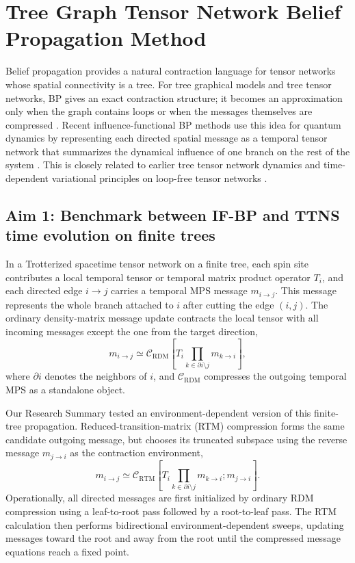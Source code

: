 \documentclass[12pt]{article}
\begin{document}
\section{Tree Graph Tensor Network Belief Propagation Method}

Belief propagation provides a natural contraction language for tensor networks whose spatial connectivity is a tree.
For tree graphical models and tree tensor networks, BP gives an exact contraction structure; it becomes an approximation only when the graph contains loops or when the messages themselves are compressed \cite{yedidiaUnderstandingBeliefPropagation2003,alkabetzTensorNetworksContraction2021}.
Recent influence-functional BP methods use this idea for quantum dynamics by representing each directed spatial message as a temporal tensor network that summarizes the dynamical influence of one branch on the rest of the system \cite{Park2025IFBP}.
This is closely related to earlier tree tensor network dynamics and time-dependent variational principles on loop-free tensor networks \cite{Shi2006Classical,Bauernfeind2020TDVPTTNS}.

\subsection{Aim 1: Benchmark between IF-BP and TTNS time evolution on finite trees}

In a Trotterized spacetime tensor network on a finite tree, each spin site contributes a local temporal tensor or temporal matrix product operator \(T_i\), and each directed edge \(i\to j\) carries a temporal MPS message \(m_{i\to j}\).
This message represents the whole branch attached to \(i\) after cutting the edge \((i,j)\).
The ordinary density-matrix message update contracts the local tensor with all incoming messages except the one from the target direction,
\begin{equation}
m_{i\to j}\simeq
\mathcal C_{\mathrm{RDM}}\!\left[
T_i\prod_{k\in \partial i\setminus j}m_{k\to i}
\right],
\end{equation}
where \(\partial i\) denotes the neighbors of \(i\), and \(\mathcal C_{\mathrm{RDM}}\) compresses the outgoing temporal MPS as a standalone object.

Our Research Summary tested an environment-dependent version of this finite-tree propagation.
Reduced-transition-matrix (RTM) compression forms the same candidate outgoing message, but chooses its truncated subspace using the reverse message \(m_{j\to i}\) as the contraction environment,
\begin{equation}
m_{i\to j}\simeq
\mathcal C_{\mathrm{RTM}}\!\left[
T_i\prod_{k\in \partial i\setminus j}m_{k\to i};
m_{j\to i}
\right].
\end{equation}
Operationally, all directed messages are first initialized by ordinary RDM compression using a leaf-to-root pass followed by a root-to-leaf pass.
The RTM calculation then performs bidirectional environment-dependent sweeps, updating messages toward the root and away from the root until the compressed message equations reach a fixed point.
\end{document}
